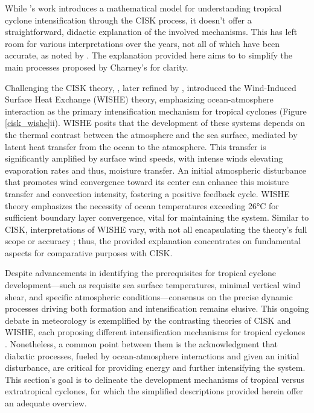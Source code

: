 While \citet{charney1964growth}'s work introduces a mathematical model for understanding tropical cyclone intensification through the CISK process, it doesn't offer a straightforward, didactic explanation of the involved mechanisms. This has left room for various interpretations over the years, not all of which have been accurate, as noted by \citet{ooyama1982conceptual}. The explanation provided here aims to to simplify the main processes proposed by Charney's for clarity.

Challenging the CISK theory, \citet{emanuel1986air}, later refined by \citet{yano1991improved}, introduced the Wind-Induced Surface Heat Exchange (WISHE) theory, emphasizing ocean-atmosphere interaction as the primary intensification mechanism for tropical cyclones (Figure \ref{cisk_wishe}ii). WISHE posits that the development of these systems depends on the thermal contrast between the atmosphere and the sea surface, mediated by latent heat transfer from the ocean to the atmosphere. This transfer is significantly amplified by surface wind speeds, with intense winds elevating evaporation rates and thus, moisture transfer. An initial atmospheric disturbance that promotes wind convergence toward its center can enhance this moisture transfer and convection intensity, fostering a positive feedback cycle. WISHE theory emphasizes the necessity of ocean temperatures exceeding 26°C for sufficient boundary layer convergence, vital for maintaining the system. Similar to CISK, interpretations of WISHE vary, with not all encapsulating the theory's full scope or accuracy \citep{montgomery2014paradigms}; thus, the provided explanation concentrates on fundamental aspects for comparative purposes with CISK.

Despite advancements in identifying the prerequisites for tropical cyclone development—such as requisite sea surface temperatures, minimal vertical wind shear, and specific atmospheric conditions—consensus on the precise dynamic processes driving both formation and intensification remains elusive. This ongoing debate in meteorology is exemplified by the contrasting theories of CISK and WISHE, each proposing different intensification mechanisms for tropical cyclones \citep[e.g.,]{craig1996cisk, gray1998formation, montgomery2015putting, ooyama1982conceptual,montgomery2014paradigms}. Nonetheless, a common point between them is the acknowledgment that diabatic processes, fueled by ocean-atmosphere interactions and given an initial disturbance, are critical for providing energy and further intensifying the system. This section's goal is to delineate the development mechanisms of tropical versus extratropical cyclones, for which the simplified descriptions provided herein offer an adequate overview.

